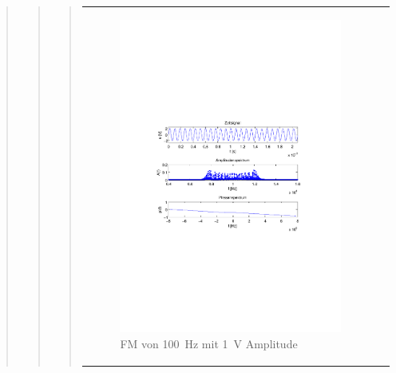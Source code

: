 \begin{quote}
\begin{quote}
\begin{quote}
\begin{center}
\begin{tabular}{ll}
                \begin{minipage}{0.6\textwidth}
                    \begin{figure}[H]
                        \includegraphics[scale=0.7, trim = 35mm 100mm 35mm 95mm, clip]{Bilder/f100_1}
                        \caption{FM von \SI{100}{\hertz} mit \SI{1}{\volt} Amplitude}
                        \label{fig:f100_1}
                    \end{figure}
                \end{minipage}
            
            \end{tabular}
            \end{center}
            

\end{quote}
\end{quote}
\end{quote}
